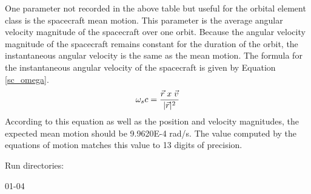 \begin{description}
One parameter not recorded in the above table but useful for the orbital
element class is the spacecraft mean motion.  This parameter is the
average angular velocity magnitude of the spacecraft over one orbit.
Because the angular velocity magnitude of the spacecraft remains constant
for the duration of the orbit, the instantaneous angular velocity is the
same as the mean motion.  The formula for the instantaneous angular velocity
of the spacecraft is given by Equation
\ref{sc_omega}.
\begin{equation}
\omega_sc = \frac{\vec{r} \thickspace x \thickspace \vec{v}}{|\vec{r}|^2}
\label{sc_omega}
\end{equation}
According to this equation as well as the position and velocity
magnitudes, the expected mean motion should be 9.9620E-4 rad/s.  The value
computed by the equations of motion matches this value to 13 digits of
precision.

Run directories:

01-04
\end{description}

